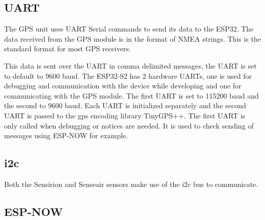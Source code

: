 \subsection{UART}
The GPS unit uses UART Serial commands to send its data to the ESP32. The data received from the GPS module is in the format of NMEA strings. This is the standard format for most GPS receivers.\cite{NMEA}
\begin{table}[!htb]
	\label{tab:nmea}
	\caption{NMEA Sentences and their meanings \cite{GPSSentence}}
\end{table}

\noindent
This data is sent over the UART in comma delimited messages, the UART is set to default to 9600 baud.
The ESP32-S2 has 2 hardware UARTs, one is used for debugging and communication with the device while developing and one for communicating with the GPS module. The first UART is set to 115200 baud and the second to 9600 baud. Each UART is initialized separately and the second UART is passed to the gps encoding library TinyGPS++. The first UART is only called when debugging or notices are needed. It is used to check sending of messages using ESP-NOW for example.


\subsection{i2c}
Both the Sensirion and Senseair sensors make use of the i2c bus to communicate. 

\subsection{ESP-NOW}



